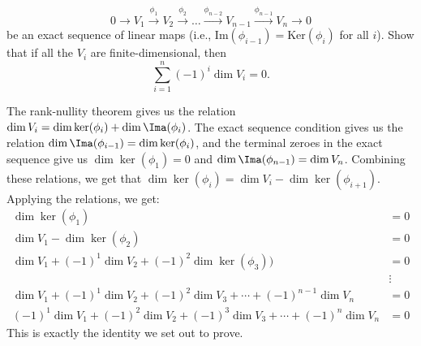 \begin{problem}
  \[0 \longrightarrow V_1 \stackrel{\phi_1}{\longrightarrow} V_2 
  \stackrel{\phi_2}{\longrightarrow} \dots
  \stackrel{\phi_{n-2}}{\longrightarrow} V_{n-1} 
  \stackrel{\phi_{n-1}}{\longrightarrow} V_n \longrightarrow 0\]
  be an exact sequence of linear maps (i.e., $\mathrm{Im}(\phi_{i-1})=\mathrm{Ker}(\phi_i)$ for all $i$). Show that if all the $V_i$ are finite-dimensional, then
  \[\sum_{i=1}^n (-1)^i \dim V_i = 0.\]
\end{problem}

The rank-nullity theorem gives us the relation $\dim V_i = \dim \ker(\phi_i) + \dim \Ima(\phi_i)$. The exact sequence condition gives us the relation $\dim \Ima(\phi_{i-1})=\dim \ker(\phi_{i})$, and the terminal zeroes in the exact sequence give us $\dim \ker(\phi_1)=0$ and $\dim \Ima(\phi_{n-1})=\dim V_n$. Combining these relations, we get that $\dim \ker(\phi_i) = \dim V_i - \dim \ker(\phi_{i+1})$. Applying the relations, we get:
\begin{align*}
  \dim \ker(\phi_1)&=0\\
  \dim V_1 - \dim \ker(\phi_2)&=0\\
  \dim V_1 + (-1)^1\dim V_2 + (-1)^2\dim \ker(\phi_3))&=0\\
  &\vdots\\
  \dim V_1 + (-1)^1\dim V_2 + (-1)^2\dim V_3 + \cdots + (-1)^{n-1}\dim V_n &= 0\\
  (-1)^1\dim V_1 + (-1)^2\dim V_2 + (-1)^3\dim V_3 + \cdots + (-1)^{n}\dim V_n &= 0
\end{align*}
This is exactly the identity we set out to prove.